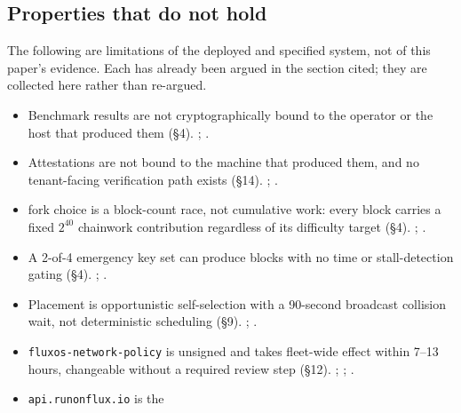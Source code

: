 \subsection{Properties that do not hold}

The following are limitations of the deployed and specified system, not of this paper's evidence.
Each has already been argued in the section cited; they are collected here rather than re-argued.

\begin{itemize}
\item Benchmark results are not cryptographically bound to the operator or the host that produced
  them (§4). \shipped; .
\item Attestations are not bound to the machine that produced them, and no tenant-facing verification
  path exists (§14). \shipped; .
\item \PoN fork choice is a block-count race, not cumulative work: every block carries a fixed
  $2^{40}$ chainwork contribution regardless of its difficulty target (§4). \shipped;
  .
\item A 2-of-4 emergency key set can produce blocks with no time or stall-detection gating (§4).
  \shipped; .
\item Placement is opportunistic self-selection with a 90-second broadcast collision wait, not
  deterministic scheduling (§9). \shipped; .
\item \texttt{fluxos-\allowbreak{}network-\allowbreak{}policy} is unsigned and takes fleet-wide effect within 7--13 hours,
  changeable without a required review step (§12). \shipped; ;
  .
\item \texttt{api.\allowbreak{}runonflux.\allowbreak{}io} is the 
\end{itemize}
